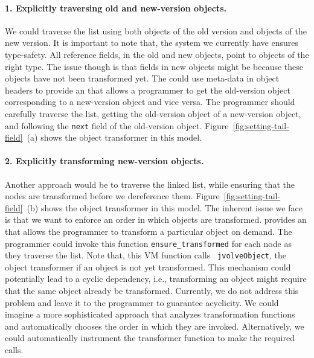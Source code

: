\paragraph{1. Explicitly traversing old and new-version objects.}
We could traverse the list using both objects of the old version and
objects of the new version. It is important to note that, the system we
currently have ensures type-safety. All reference fields, in the old and
new objects, point to objects of the right type. The issue though is that
fields in new objects might be \NULL because these objects have not
been transformed yet.  The \VM could use meta-data in object headers to provide an \API that allows a
programmer to get the old-version object corresponding to a new-version
object and vice versa. %
The programmer should carefully traverse the list,
getting the old-version object of a new-version object, and following the
{\tt next} field of the old-version object.
Figure~\ref{fig:setting-tail-field}~(a) shows the object transformer in
this model.

\paragraph{2. Explicitly transforming new-version objects.}
Another approach would be to traverse the linked list, while ensuring that
the nodes are transformed before we dereference them.
Figure~\ref{fig:setting-tail-field}~(b) shows the object transformer in
this model.  The inherent issue we face is that we want to
enforce an order in which objects are transformed. \JV provides an \API
that allows the programmer to transform a particular object on demand. The
programmer could invoke this function {\tt ensure\_transformed} for each
node as they traverse the list. Note that, this VM function calls {\tt
jvolveObject}, the object transformer if an object is not yet transformed.
This mechanism could potentially lead to a cyclic dependency, i.e., transforming an
object might require that the same object already be transformed.
Currently, we do not
address this problem and leave it to the programmer to guarantee
acyclicity.
We could imagine a more sophisticated approach that analyzes
transformation functions and automatically chooses the order in which they
are invoked. Alternatively, we could automatically instrument the
transformer function to make the required \API calls.

